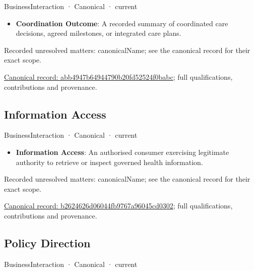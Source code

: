 \label{element:abb4947b64944790b20fd52524f0babc}
{\small BusinessInteraction · Canonical · current}\par

\begin{itemize}


\item \textbf{Coordination Outcome}: A recorded summary of coordinated care decisions, agreed milestones, or integrated care plans.

\end{itemize}

{\small Recorded unresolved matters: canonicalName; see the canonical record for their exact scope.}\par
{\footnotesize \href{../../../../continuum/business/business-interaction/abb4947b64944790b20fd52524f0babc.md}{Canonical record: abb4947b64944790b20fd52524f0babc}; full qualifications, contributions and provenance.}\par
\subsection{Information Access}

\label{element:b2624626d06044fb9767a96045cd0302}
{\small BusinessInteraction · Canonical · current}\par

\begin{itemize}


\item \textbf{Information Access}: An authorised consumer exercising legitimate authority to retrieve or inspect governed health information.

\end{itemize}

{\small Recorded unresolved matters: canonicalName; see the canonical record for their exact scope.}\par
{\footnotesize \href{../../../../continuum/business/business-interaction/b2624626d06044fb9767a96045cd0302.md}{Canonical record: b2624626d06044fb9767a96045cd0302}; full qualifications, contributions and provenance.}\par
\subsection{Policy Direction}

\label{element:b2c573b855ad4c7abc4f02b2ae484a65}
{\small BusinessInteraction · Canonical · current}\par

